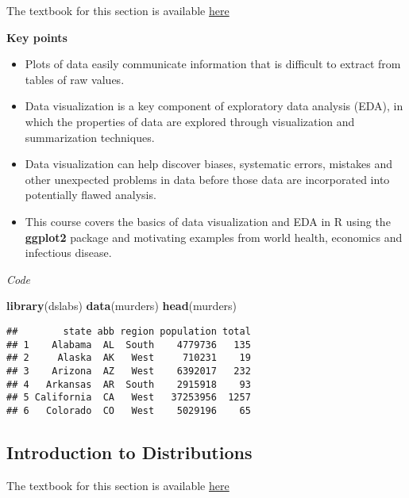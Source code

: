 \documentclass[]{article}
\newenvironment{Shaded}{\begin{snugshade}}{\end{snugshade}}
\newcommand{\KeywordTok}[1]{\textcolor[rgb]{0.13,0.29,0.53}{\textbf{#1}}}
\newcommand{\NormalTok}[1]{#1}
\providecommand{\tightlist}{%
  \setlength{\itemsep}{0pt}\setlength{\parskip}{0pt}}
\begin{document}
The textbook for this section is available
\href{https://rafalab.github.io/dsbook/introduction-to-data-visualization.html}{here}

\textbf{Key points}

\begin{itemize}
\tightlist
\item
  Plots of data easily communicate information that is difficult to
  extract from tables of raw values.
\item
  Data visualization is a key component of exploratory data analysis
  (EDA), in which the properties of data are explored through
  visualization and summarization techniques.
\item
  Data visualization can help discover biases, systematic errors,
  mistakes and other unexpected problems in data before those data are
  incorporated into potentially flawed analysis.
\item
  This course covers the basics of data visualization and EDA in R using
  the \textbf{ggplot2} package and motivating examples from world
  health, economics and infectious disease.
\end{itemize}

\emph{Code}

\begin{Shaded}
\begin{Highlighting}[]
\KeywordTok{library}\NormalTok{(dslabs)}
\KeywordTok{data}\NormalTok{(murders)}
\KeywordTok{head}\NormalTok{(murders)}
\end{Highlighting}
\end{Shaded}

\begin{verbatim}
##        state abb region population total
## 1    Alabama  AL  South    4779736   135
## 2     Alaska  AK   West     710231    19
## 3    Arizona  AZ   West    6392017   232
## 4   Arkansas  AR  South    2915918    93
## 5 California  CA   West   37253956  1257
## 6   Colorado  CO   West    5029196    65
\end{verbatim}

\hypertarget{introduction-to-distributions}{%
\subsection{Introduction to
Distributions}\label{introduction-to-distributions}}

The textbook for this section is available
\href{https://rafalab.github.io/dsbook/distributions.html}{here}
\end{document}
